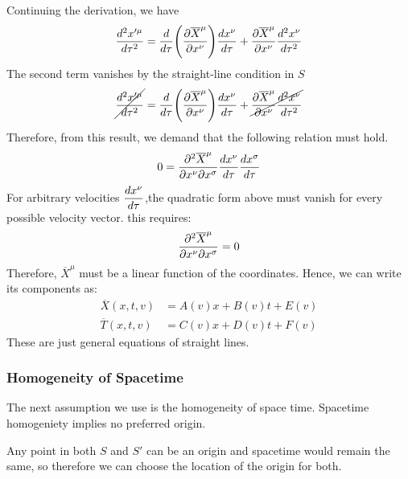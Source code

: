 		Continuing the derivation, we have
		\begin{equation}
			\dv[2]{x'^\mu}{\tau} 
			= 
			\dv{}{\tau}\pqty{\pdv{\overline{X}^\mu}{x^\nu}} \dv{x^\nu}{\tau} 
			+ \pdv{\overline{X}^\mu}{x^\nu} \dv[2]{x^\nu}{\tau}
			\label{eq:chain-rule-second}
		\end{equation}
		The second term vanishes by the straight-line condition in $S$
		\begin{equation}
			\cancel{
			\dv[2]{x'^\mu}{\tau}}
		= 
		\dv{}{\tau}\pqty{\pdv{\overline{X}^\mu}{x^\nu}} \dv{x^\nu}{\tau} 
		+ \cancel{\pdv{\overline{X}^\mu}{x^\nu} \dv[2]{x^\nu}{\tau}}
		\label{eq:chain-rule-second-term}
		\end{equation}
		Therefore, from this result, we demand that the following relation must hold.
		\begin{equation}
			0 = \pdv[2]{\overline{X}^\mu}{x^\nu}{x^\sigma} \dv{x^\nu}{\tau} \dv{x^\sigma}{\tau}
			\label{eq:second-derivative-condition}
		\end{equation}
		For arbitrary velocities $\displaystyle\dv{x^\nu}{\tau}$,the quadratic form above must vanish for every possible velocity vector. this requires:
		\begin{equation}
			\pdv[2]{\overline{X}^\mu}{x^\nu}{x^\sigma} = 0
			\label{eq:linearity-condition}
		\end{equation}
		Therefore, $\overline{X}^\mu$ must be a linear function of the coordinates. Hence, we can write its components as:
		\begin{align*}
			\overline{X}(x,t,v) &= A(v)x + B(v)t + E(v)\\
			\overline{T}(x,t,v) &= C(v)x + D(v)t + F(v)
		\end{align*}
		These are just general equations of straight lines. 
	\subsubsection{Homogeneity of Spacetime}
		The next assumption we use is the homogeneity of space time.
		Spacetime homogeniety implies no preferred origin.

		Any point in both $S$ and $S'$ can be an 
		origin and spacetime would remain the same, so therefore we can choose the 
		location of the origin for both. 

